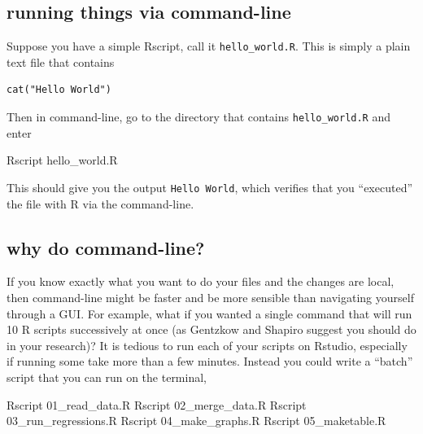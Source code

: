 \documentclass[]{book}
\newenvironment{Shaded}{\begin{snugshade}}{\end{snugshade}}
\newcommand{\ExtensionTok}[1]{#1}
\newcommand{\NormalTok}[1]{#1}
\theoremstyle{definition}
\theoremstyle{definition}
\theoremstyle{definition}
\theoremstyle{remark}
\begin{document}
\hypertarget{running-things-via-command-line}{%
\subsection{running things via command-line}\label{running-things-via-command-line}}

Suppose you have a simple Rscript, call it \texttt{hello\_world.R}. This is simply a plain text file that contains

\begin{verbatim}
cat("Hello World")
\end{verbatim}

Then in command-line, go to the directory that contains \texttt{hello\_world.R} and enter

\begin{Shaded}
\begin{Highlighting}[]
\ExtensionTok{Rscript}\NormalTok{ hello_world.R}
\end{Highlighting}
\end{Shaded}

This should give you the output \texttt{Hello\ World}, which verifies that you ``executed'' the file with R via the command-line.

\hypertarget{why-do-command-line}{%
\subsection{why do command-line?}\label{why-do-command-line}}

If you know exactly what you want to do your files and the changes are local, then command-line might be faster and be more sensible than navigating yourself through a GUI. For example, what if you wanted a single command that will run 10 R scripts successively at once (as Gentzkow and Shapiro suggest you should do in your research)? It is tedious to run each of your scripts on Rstudio, especially if running some take more than a few minutes. Instead you could write a ``batch'' script that you can run on the terminal,

\begin{Shaded}
\begin{Highlighting}[]
\ExtensionTok{Rscript}\NormalTok{ 01_read_data.R}
\ExtensionTok{Rscript}\NormalTok{ 02_merge_data.R}
\ExtensionTok{Rscript}\NormalTok{ 03_run_regressions.R}
\ExtensionTok{Rscript}\NormalTok{ 04_make_graphs.R}
\ExtensionTok{Rscript}\NormalTok{ 05_maketable.R}
\end{Highlighting}
\end{Shaded}
\end{document}
